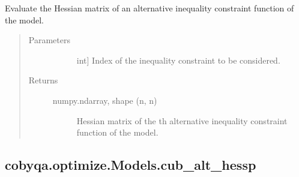\documentclass[letterpaper,10pt,english]{sphinxmanual}
\begin{document}
\begin{fulllineitems}
\begin{fulllineitems}
\label{\detokenize{refs/generated/cobyqa.optimize.Models.cub_alt_hess:cobyqa.optimize.Models.cub_alt_hess}}
\sphinxAtStartPar
Evaluate the Hessian matrix of an alternative inequality constraint
function of the model.
\begin{quote}\begin{description}
\item[{Parameters}] \leavevmode\begin{description}
\item[{}] \leavevmode{[}int{]}
\sphinxAtStartPar
Index of the inequality constraint to be considered.

\end{description}

\item[{Returns}] \leavevmode\begin{description}
\item[{numpy.ndarray, shape (n, n)}] \leavevmode
\sphinxAtStartPar
Hessian matrix of the \sphinxhyphen{}th alternative inequality constraint
function of the model.

\end{description}

\end{description}\end{quote}

\end{fulllineitems}



\subsection{cobyqa.optimize.Models.cub\_alt\_hessp}
\label{\detokenize{refs/generated/cobyqa.optimize.Models.cub_alt_hessp:cobyqa-optimize-models-cub-alt-hessp}}\label{\detokenize{refs/generated/cobyqa.optimize.Models.cub_alt_hessp::doc}}


\end{fulllineitems}
\end{document}
